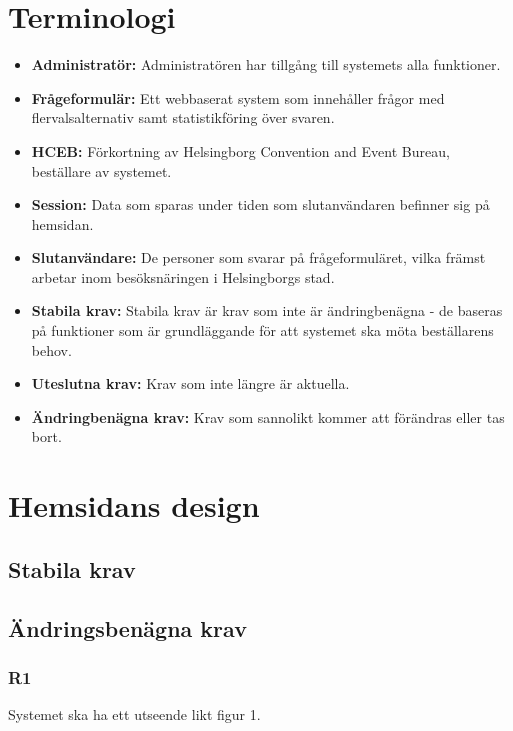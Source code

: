 \documentclass{article}
\begin{document}
    \section{Terminologi}
    \begin{itemize}
        \item \textbf{Administratör:} Administratören har tillgång till systemets alla funktioner.
         \item \textbf{Frågeformulär:} Ett webbaserat system som innehåller frågor med flervalsalternativ samt statistikföring över svaren.
        \item \textbf{HCEB:} Förkortning av Helsingborg Convention and Event Bureau, beställare av systemet.
        \item \textbf{Session:} Data som sparas under tiden som slutanvändaren befinner sig på hemsidan.
        \item \textbf{Slutanvändare:}  De personer som svarar på frågeformuläret, vilka främst arbetar inom besöksnäringen i Helsingborgs stad. 
        \item\textbf{Stabila krav:}  Stabila krav är krav som inte är ändringbenägna - de baseras på funktioner som är grundläggande för att systemet ska möta beställarens behov.
         \item \textbf{Uteslutna krav:}  Krav som inte längre är aktuella.
        \item \textbf{Ändringbenägna krav:}  Krav som sannolikt kommer att förändras eller tas bort.
       
    \end{itemize}
    \newpage
    \section{Hemsidans design}
    
    \subsection*{Stabila krav}
     
    \subsection*{Ändringsbenägna krav}
     \subsubsection*{R1}
    Systemet ska ha ett utseende likt figur 1.
    
\end{document}
